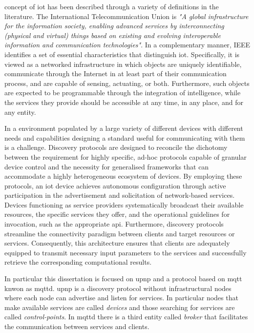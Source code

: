 \documentclass[lettersize,journal]{IEEEtran}
\begin{document}
 concept of \gls{iot} has been described through a variety of definitions in the literature. The International Telecommunication Union is \textit{"A global infrastructure for the information society, enabling advanced services by interconnecting (physical and virtual) things based on existing and evolving interoperable information and communication technologies"}\cite{ITU_Y.2060}. In a complementary manner, IEEE identifies a set of essential characteristics that distinguish \gls{iot}. Specifically, it is viewed as a networked infrastructure in which objects are uniquely identifiable, communicate through the Internet in at least part of their communication process, and are capable of sensing, actuating, or both. Furthermore, such objects are expected to be programmable through the integration of intelligence, while the services they provide should be accessible at any time, in any place, and for any entity.

In a environment populated by a large variety of different devices with different needs and capabilities designing a standard useful for communicating with them is a challenge.
Discovery protocols are designed to reconcile the dichotomy between the requirement for highly specific, ad-hoc protocols capable of granular device control and the necessity for generalised frameworks that can accommodate a highly heterogeneous ecosystem of devices.
By employing these protocols, an \gls{iot} device achieves autonomous configuration through active participation in the advertisement and solicitation of network-based services.
Devices functioning as service providers systematically broadcast their available resources, the specific services they offer, and the operational guidelines for invocation, such as the appropriate \gls{api}. Furthermore, discovery protocols streamline the connectivity paradigm between clients and target resources or services. 
Consequently, this architecture ensures that clients are adequately equipped to transmit necessary input parameters to the services and successfully retrieve the corresponding computational results.

In particular this dissertation is focused on \gls{upnp} and a protocol based on \gls{mqtt} knwon as \gls{mqttd}. \gls{upnp} is a discovery protocol without infrastructural nodes where each node can advertise and listen for services. In particular nodes that make available services are called \textit{devices} and those searching for services are called \textit{control-points}.
In \gls{mqttd} there is a third entity called \textit{broker} that facilitates the communication between services and clients.
\end{document}
